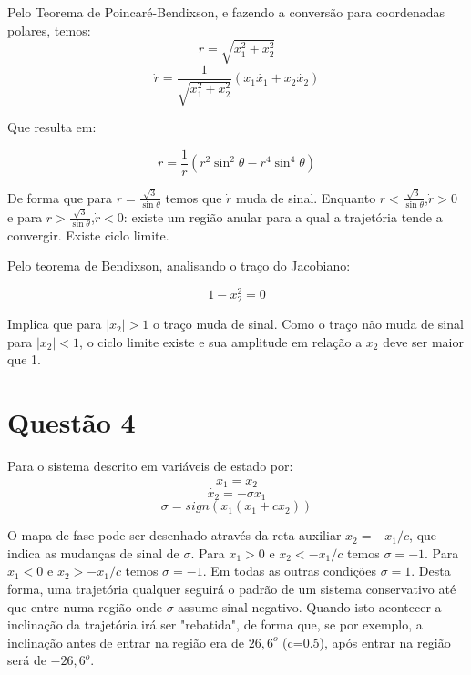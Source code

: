  Pelo Teorema de Poincaré-Bendixson, e fazendo a conversão para coordenadas polares, temos:\\
 
 \begin{equation}
 r = \sqrt{x_1^2 + x_2^2}
 \end{equation} 
\begin{equation}
\dot{r} = \frac{1}{\sqrt{x_1^2+x_2^2}}(x_1\dot{x_1} + x_2\dot{x_2})
\end{equation}

\noindent Que resulta em:

\begin{equation}
\dot{r} = \frac{1}{r}(r^2\sin^2\theta-r^4\sin^4\theta)
\end{equation}

\noindent De forma que para $r=\frac{\sqrt{3}}{\sin\theta}$ temos que $\dot{r}$ muda de sinal. Enquanto $r<\frac{\sqrt{3}}{\sin\theta}$,$\dot{r}>0$ e para  $r>\frac{\sqrt{3}}{\sin\theta}$,$\dot{r}<0$: existe um região anular para a qual a trajetória tende a convergir. Existe ciclo limite. 

Pelo teorema de Bendixson, analisando o traço do Jacobiano:

\begin{equation}
1-x_2^2=0
\end{equation}

Implica que para $|x_2|>1$ o traço muda de sinal. Como o traço não muda de sinal para $|x_2|<1$, o ciclo limite existe e sua amplitude em relação a $x_2$ deve ser maior que 1.

\section{Questão 4}
Para o sistema descrito em variáveis de estado por:
\begin{equation}
\dot{x_1} = x_2
\end{equation}
\begin{equation}
\dot{x_2} = -\sigma x_1
\end{equation}
\begin{equation}
\sigma = sign(x_1(x_1+cx_2))
\end{equation}

\noindent O mapa de fase pode ser desenhado através da reta auxiliar $x_2 = -x_1/c$, que indica as mudanças de sinal de $\sigma$. Para $x_1>0$ e $x_2<-x_1/c$ temos $\sigma=-1$. Para $x_1<0$ e $x_2>-x_1/c$ temos $\sigma=-1$. Em todas as outras condições $\sigma=1$. Desta forma, uma trajetória qualquer seguirá o padrão de um sistema conservativo até que entre numa região onde $\sigma$ assume sinal negativo. Quando isto acontecer a inclinação da trajetória irá ser "rebatida", de forma que, se por exemplo, a inclinação antes de entrar na região era de $26,6^o$ (c=0.5), após entrar na região será de $-26,6^o$.\\ 

